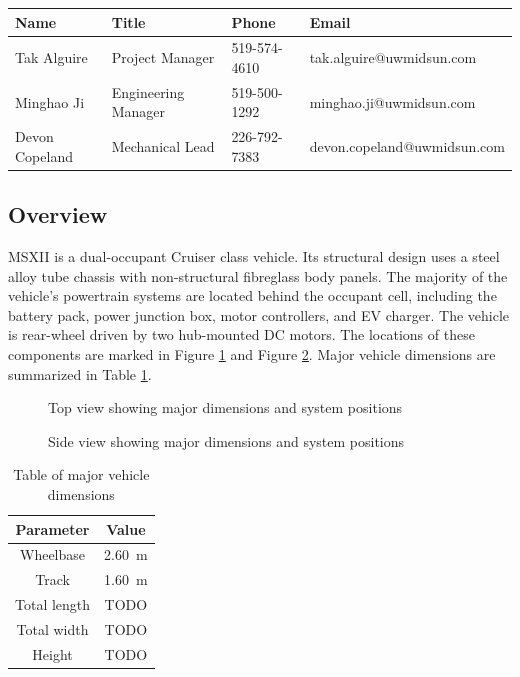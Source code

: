 \documentclass[10pt]{article}
\begin{document}
\begin{table}[!h]
\centering
\begin{tabular}{llll}
\toprule
Name            & Title               & Phone        & Email \\
\midrule        
Tak Alguire     & Project Manager     & 519-574-4610 & tak.alguire@uwmidsun.com \\
Minghao Ji      & Engineering Manager & 519-500-1292 & minghao.ji@uwmidsun.com \\
Devon Copeland  & Mechanical Lead     & 226-792-7383 & devon.copeland@uwmidsun.com \\
\bottomrule
\end{tabular}
\end{table}

\subsection{Overview}
MSXII is a dual-occupant Cruiser class vehicle. Its structural design uses a steel alloy tube chassis with non-structural fibreglass body panels. The majority of the vehicle's powertrain systems are located behind the occupant cell, including the battery pack, power junction box, motor controllers, and EV charger. The vehicle is rear-wheel driven by two hub-mounted DC motors. The locations of these components are marked in Figure \ref{fig:msxii-top-view} and Figure \ref{fig:msxii-side-view}. Major vehicle dimensions are summarized in Table \ref{tab:msxii-dimensions}.

\begin{figure}
\centering
\caption{Top view showing major dimensions and system positions}
\label{fig:msxii-top-view}
\end{figure}

\begin{figure}
\centering
\caption{Side view showing major dimensions and system positions}
\label{fig:msxii-side-view}
\end{figure}

\begin{table}
\centering
\begin{tabular}{cc}
\toprule
Parameter & Value \\
\midrule
Wheelbase    & \SI{2.60}{\metre} \\
Track        & \SI{1.60}{\metre} \\
Total length & TODO              \\
Total width  & TODO              \\
Height       & TODO              \\
\bottomrule
\end{tabular}
\caption{Table of major vehicle dimensions}
\label{tab:msxii-dimensions}
\end{table}
\end{document}
